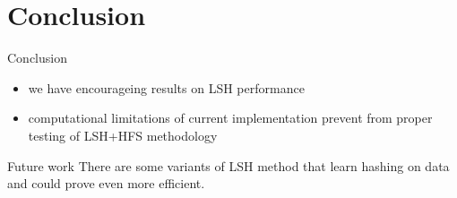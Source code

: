 \documentclass[11pt)]{beamer}
\begin{document}
\section{Conclusion}
\begin{frame}{Conclusion}
\begin{itemize}
\item we have encourageing results on LSH performance
\item computational limitations of current implementation prevent from proper testing of LSH+HFS methodology
\end{itemize}
\end{frame}

\begin{frame}{Future work}
There are some variants of LSH method that learn hashing on data and could prove even more efficient.
\end{frame}
\end{document}
